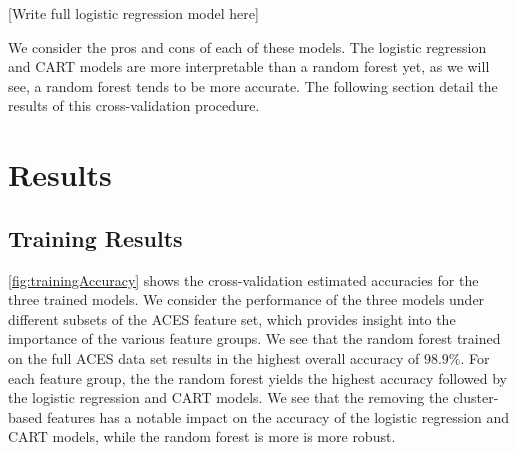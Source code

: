 \documentclass[
]{jdssv}
\begin{document}
{[}Write full logistic regression model here{]}

We consider the pros and cons of each of these models. The logistic
regression and CART models are more interpretable than a random forest
yet, as we will see, a random forest tends to be more accurate. The
following section detail the results of this cross-validation procedure.

\hypertarget{results}{%
\section{Results}\label{results}}

\hypertarget{training-results}{%
\subsection{Training Results}\label{training-results}}

\autoref{fig:trainingAccuracy} shows the cross-validation estimated
accuracies for the three trained models. We consider the performance of
the three models under different subsets of the ACES feature set, which
provides insight into the importance of the various feature groups. We
see that the random forest trained on the full ACES data set results in
the highest overall accuracy of \(98.9\%\). For each feature group, the
the random forest yields the highest accuracy followed by the logistic
regression and CART models. We see that the removing the cluster-based
features has a notable impact on the accuracy of the logistic regression
and CART models, while the random forest is more is more robust.
\end{document}
